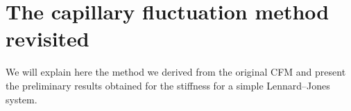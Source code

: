 \chapter{The capillary fluctuation method revisited}
\label{ch:CFM}

%    
%    
%    

We will explain here the method we derived from the original CFM and present the preliminary results obtained for the stiffness for a simple Lennard--Jones system.


